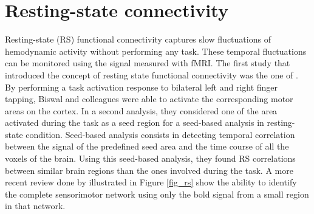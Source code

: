 \section{Resting-state connectivity}
Resting-state (RS) functional connectivity captures slow fluctuations of hemodynamic activity without performing any task. These temporal fluctuations can be monitored using the signal measured with fMRI. The first study that introduced the concept of resting state functional connectivity was the one of \cite{Biswal1995}. By performing a task activation response to bilateral left and right finger tapping, Biswal and colleagues were able to activate the corresponding motor areas on the cortex. In a second analysis, they considered one of the area activated during the task as a seed region for a seed-based analysis in resting-state condition. Seed-based analysis consists in detecting temporal correlation between the signal of the predefined seed area and the time course of all the voxels of the brain. Using this seed-based analysis, they found RS correlations between similar brain regions than the ones involved during the task. A more recent review done 
by \cite{Fox2007} illustrated in Figure \ref{fig_rs} show the ability to identify the complete sensorimotor network using only the bold signal from a small region in that network. 

